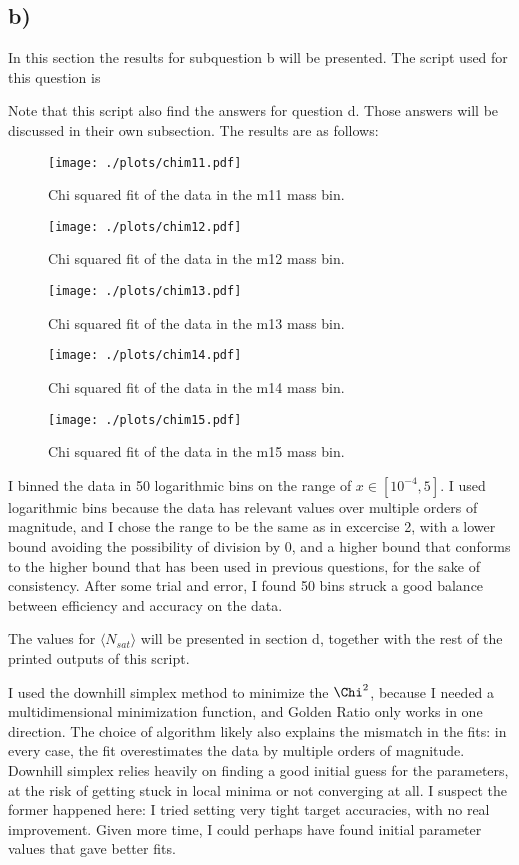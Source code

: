 \subsection*{b)}
In this section the results for subquestion b will be presented. The script used for this question is 

Note that this script also find the answers for question d. Those answers will be discussed in their own subsection.
The results are as follows:
\begin{figure}[!h]
    \centering
    \texttt{[image: ./plots/chim11.pdf]}
    \caption{Chi squared fit of the data in the m11 mass bin.}
    \label{fig:chim11}
\end{figure}

\begin{figure}[!h]
    \centering
    \texttt{[image: ./plots/chim12.pdf]}
    \caption{Chi squared fit of the data in the m12 mass bin.}
    \label{fig:chim12}
\end{figure}

\begin{figure}[!h]
    \centering
    \texttt{[image: ./plots/chim13.pdf]}
    \caption{Chi squared fit of the data in the m13 mass bin.}
    \label{fig:chim13}
\end{figure}

\begin{figure}[!h]
    \centering
    \texttt{[image: ./plots/chim14.pdf]}
    \caption{Chi squared fit of the data in the m14 mass bin.}
    \label{fig:chim14}
\end{figure}

\begin{figure}[!h]
    \centering
    \texttt{[image: ./plots/chim15.pdf]}
    \caption{Chi squared fit of the data in the m15 mass bin.}
    \label{fig:chim15}
\end{figure}

I binned the data in 50 logarithmic bins on the range of $x \in [ 10^{-4},5]$. I used logarithmic bins because the data has relevant values over multiple orders of magnitude, and I chose the range to be the same as in excercise 2, with a lower bound avoiding the possibility of division by 0, and a higher bound that conforms to the higher bound that has been used in previous questions, for the sake of consistency. After some trial and error, I found 50 bins struck a good balance between efficiency and accuracy on the data.

The values for $\langle N_{sat} \rangle$ will be presented in section d, together with the rest of the printed outputs of this script.

I used the downhill simplex method to minimize the $\Chi^2$, because I needed a multidimensional minimization function, and Golden Ratio only works in one direction. The choice of algorithm likely also explains the mismatch in the fits: in every case, the fit overestimates the data by multiple orders of magnitude. Downhill simplex relies heavily on finding a good initial guess for the parameters, at the risk of getting stuck in local minima or not converging at all. I suspect the former happened here: I tried setting very tight target accuracies, with no real improvement. Given more time, I could perhaps have found initial parameter values that gave better fits. 
